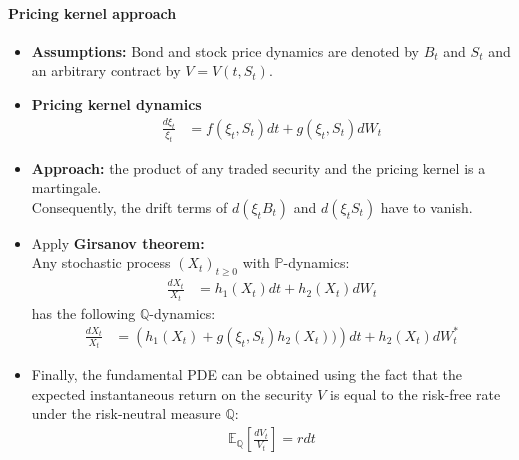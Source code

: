 \documentclass[a4paper,landscape,7pt,fleqn]{scrartcl}
\renewcommand{\emph}[1]{\textbf{#1}}
\begin{document}
\begin{multicols*}{3}
\paragraph{Pricing kernel approach}
\begin{itemize}
\item \emph{Assumptions:} Bond and stock price dynamics are denoted by $B_t$ and $S_t$ and an arbitrary contract by $V = V(t,S_t)$.
\item \emph{Pricing kernel dynamics}
\begin{align*}
\frac{d \xi_t}{\xi_t} &= f(\xi_t,S_t) dt + g(\xi_t,S_t) dW_t
\end{align*}
\item \emph{Approach:} the product of any traded security and the pricing kernel is a martingale. \\
Consequently, the drift terms of $d(\xi_t B_t)$ and $d(\xi_t S_t)$ have to vanish.
\item Apply \emph{Girsanov theorem:} \\
Any stochastic process $(X_t)_{t \geq 0}$ with $\mathbb{P}$-dynamics:
\begin{align*}
\frac{dX_t}{X_t} &= h_1(X_t) dt + h_2(X_t) dW_t
\end{align*}
has the following $\mathbb{Q}$-dynamics:
\begin{align*}
\frac{dX_t}{X_t} &= \left( h_1(X_t) + g(\xi_t,S_t) h_2(X_t)) \right) dt + h_2(X_t) dW_t^\ast
\end{align*}
\item Finally, the fundamental PDE can be obtained using the fact that the expected instantaneous return on the security $V$ is equal to the risk-free rate under the risk-neutral measure $\mathbb{Q}$:
\begin{align*}
\mathbb{E}_\mathbb{Q} \left[ \frac{dV_t}{V_t} \right] = r dt
\end{align*}
\end{itemize}


\end{multicols*}
\end{document}
